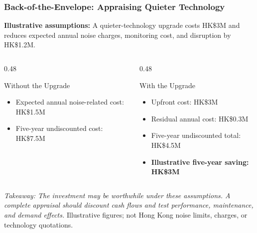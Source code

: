 \documentclass{beamer}
\begin{document}
\begin{frame}[t,shrink=11]
\frametitle{Back-of-the-Envelope: Appraising Quieter Technology}
\textbf{Illustrative assumptions:} A quieter-technology upgrade costs HK\$3M and reduces expected annual noise charges, monitoring cost, and disruption by HK\$1.2M.
\begin{columns}[T]
\begin{column}{0.48\textwidth}\begin{block}{Without the Upgrade}
\begin{itemize}
\item Expected annual noise-related cost: HK\$1.5M
\item Five-year undiscounted cost: HK\$7.5M
\end{itemize}\end{block}\end{column}
\begin{column}{0.48\textwidth}\begin{block}{With the Upgrade}
\begin{itemize}
\item Upfront cost: HK\$3M
\item Residual annual cost: HK\$0.3M
\item Five-year undiscounted total: HK\$4.5M
\item \textbf{Illustrative five-year saving: HK\$3M}
\end{itemize}\end{block}\end{column}
\end{columns}
\textit{Takeaway: The investment may be worthwhile under these assumptions. A complete appraisal should discount cash flows and test performance, maintenance, and demand effects.}
\vfill{\tiny Illustrative figures; not Hong Kong noise limits, charges, or technology quotations.}
\end{frame}
\end{document}
